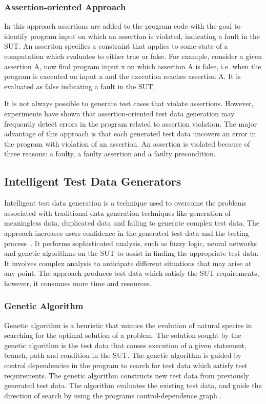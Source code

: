 \subsubsection{Assertion-oriented Approach}
In this approach assertions are added to the program code with the goal to identify program input on which an assertion is violated, indicating a fault in the SUT. An assertion specifies a constraint that applies to some state of a computation which evaluates to either true or false. For example, consider a given assertion A, now find program input x on which assertion A is false, i.e. when the program is executed on input x and the execution reaches assertion A. It is evaluated as false indicating a fault in the SUT.

It is not always possible to generate test cases that violate assertions. However, experiments have shown that assertion-oriented test data generation may frequently detect errors in the program related to assertion violation. The major advantage of this approach is that each generated test data uncovers an error in the program with violation of an assertion. An assertion is violated because of three reasons: a faulty, a faulty assertion and a faulty precondition.



\subsection{Intelligent Test Data Generators}
\label{sec:intelligent_2}
 Intelligent test data generation is a technique used to overcome the problems associated with traditional data generation techniques like generation of meaningless data, duplicated data and failing to generate complex test data. The approach increases users confidence in the generated test data and the testing process~\cite{ramamoorthy1975testing}. It performs sophisticated analysis, such as fuzzy logic, neural networks and genetic algorithms on the SUT to assist in finding the appropriate test data. It involves complex analysis to anticipate different situations that may arise at any point. The approach produces test data which satisfy the SUT requirements, however, it consumes more time and resources.

\subsubsection{Genetic Algorithm}
Genetic algorithm is a heuristic that mimics the evolution of natural species in searching for the optimal solution of a problem. The solution sought by the genetic algorithm is the test data that causes execution of a given statement, branch, path and condition in the SUT. The genetic algorithm is guided by control dependencies in the program to search for test data which satisfy test requirements. The genetic algorithm constructs new test data from previously generated test data. The algorithm evaluates the existing test data, and guide the direction of search by using the programs control-dependence graph \cite{pargas1999test}.

